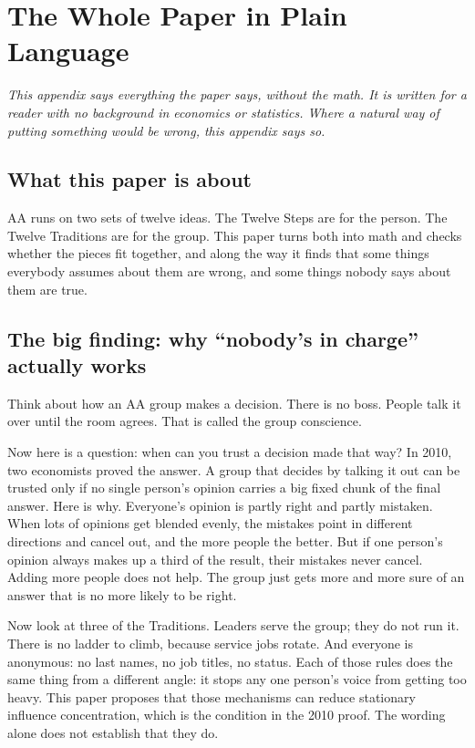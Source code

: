 \documentclass[11pt,a4paper]{article}
\begin{document}
\appendix
\section{The Whole Paper in Plain Language}

\textit{This appendix says everything the paper says, without the math. It is
written for a reader with no background in economics or statistics. Where a
natural way of putting something would be wrong, this appendix says so.}

\subsection{What this paper is about}

AA runs on two sets of twelve ideas. The Twelve Steps are for the person. The
Twelve Traditions are for the group. This paper turns both into math and checks
whether the pieces fit together, and along the way it finds that some things
everybody assumes about them are wrong, and some things nobody says about them are
true.

\subsection{The big finding: why ``nobody's in charge'' actually works}

Think about how an AA group makes a decision. There is no boss. People talk it
over until the room agrees. That is called the group conscience.

Now here is a question: when can you trust a decision made that way? In 2010, two
economists proved the answer. A group that decides by talking it out can be
trusted only if no single person's opinion carries a big fixed chunk of the final
answer. Here is why. Everyone's opinion is partly right and partly mistaken. When
lots of opinions get blended evenly, the mistakes point in different directions
and cancel out, and the more people the better. But if one person's opinion always
makes up a third of the result, their mistakes never cancel. Adding more people
does not help. The group just gets more and more sure of an answer that is no more
likely to be right.

Now look at three of the Traditions. Leaders serve the group; they do not run it.
There is no ladder to climb, because service jobs rotate. And everyone is
anonymous: no last names, no job titles, no status. Each of those rules does the
same thing from a different angle: it stops any one person's voice from getting
too heavy. This paper proposes that those mechanisms can reduce stationary
influence concentration, which is the condition in the 2010 proof. The wording
alone does not establish that they do.
\end{document}
